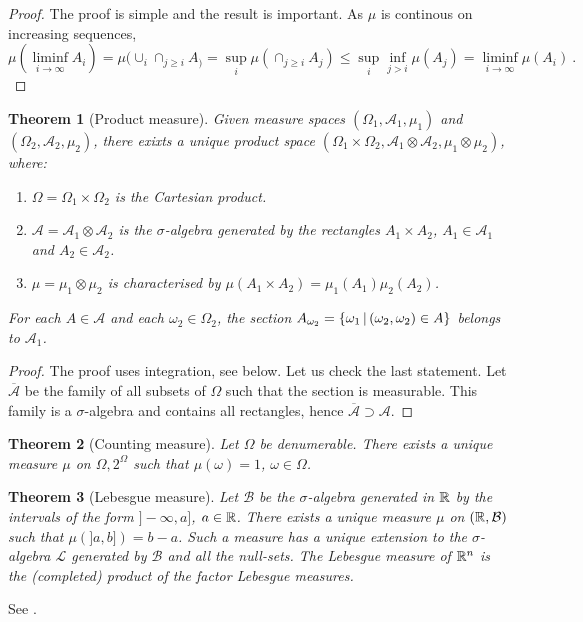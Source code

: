 \documentclass[12pt,a4paper]{amsart}
\theoremstyle{plain}
\newtheorem{theorem}{Theorem}%
\theoremstyle{definition}
\theoremstyle{remark}
\begin{document}
\begin{proof} The proof is simple and the result is important. As
  $\mu$ is continous on increasing sequences,
  \begin{equation*}
\mu(\liminf_{i\to\infty} A_i) = \mu(\cup_i \cap_{j\ge i} A_) = \sup_i
\mu(\cap_{j \geq i} A_j) \leq \sup_i \inf_{j > i} \mu(A_j) =
\liminf_{i\to\infty} \mu(A_i) \ .   
  \end{equation*}
\end{proof}

\begin{theorem}[Product measure] Given measure spaces
  $(\Omega_1,\mathcal A_1,\mu_1)$ and $(\Omega_2,\mathcal A_2,\mu_2)$,
  there exixts a unique \emph{product space} $(\Omega_1 \times
  \Omega_2, \mathcal A_1 \otimes \mathcal A_2, \mu_1 \otimes \mu_2)$, where:
  \begin{enumerate}
  \item $\Omega = \Omega_1 \times \Omega _2$ is the Cartesian product.
  \item $\mathcal A = \mathcal A_1 \otimes \mathcal A_2$ is the
    $\sigma$-algebra generated by the rectangles $A_1 \times A_2$,
    $A_1 \in \mathcal A_1$ and $A_2 \in \mathcal A_2$. 
  \item $\mu = \mu_1 \otimes \mu_2$ is characterised by $\mu(A_1
    \times A_2) = \mu_1(A_1) \mu_2(A_2)$.
  \end{enumerate}
For each $A \in \mathcal A$ and each $\omega_2 \in \Omega_2$, the
section $A_{\omega_2} = \left\{\omega_1 \, \middle| \, (\omega_2,\omega_2) \in A \right\}$
belongs to $\mathcal A_1$.
\end{theorem}

\begin{proof}
  The proof uses integration, see below. Let us check the last
  statement. Let $\overline {\mathcal A}$ be the family of all subsets of
  $\Omega$ such that the section is measurable. This family is a
  $\sigma$-algebra and contains all rectangles, hence $\overline {\mathcal A}
  \supset \mathcal A$.
\end{proof}

\begin{theorem}[Counting measure] Let $\Omega$ be denumerable. There
  exists a unique measure $\mu$ on $\Omega,2^\Omega$ such that
  $\mu(\omega) = 1$, $\omega \in \Omega$.
\end{theorem}

\begin{theorem}[Lebesgue measure] Let $\mathcal B$ be the
  $\sigma$-algebra generated in $\mathbb{R}$ by the intervals of the form
  $]-\infty,a]$, $a\in\mathbb{R}$. There exists a unique measure $\mu$ on
  $(\mathbb{R},\mathcal B)$ such that $\mu(]a,b])=b-a$. Such a measure has
  a unique extension to the $\sigma$-algebra $\mathcal L$ generated by
  $\mathcal B$ and all the null-sets. The Lebesgue measure of
  $\mathbb{R}^n$ is the (completed) product of the factor Lebesgue measures.
\end{theorem}
See \cite[Th. 2.20]{rudin:1987-3rd}.
\end{document}
